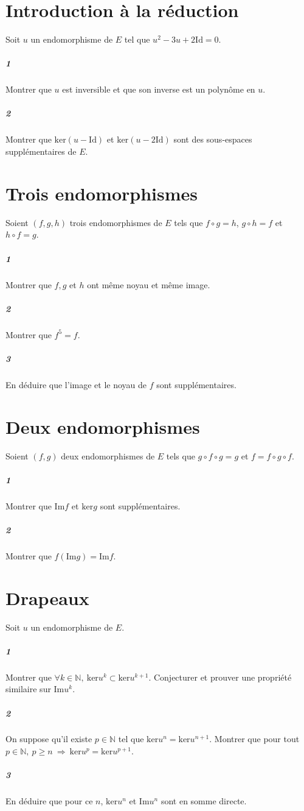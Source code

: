 \documentclass[10pt,a4paper]{article}
\begin{document}
\section{Introduction à la réduction}
Soit $u$ un endomorphisme de $E$ tel que $u^2-3u+2 \text{Id}=0$.
\subparagraph{1}Montrer que $u$ est inversible et que son inverse est un polynôme en $u$.
\subparagraph{2}Montrer que $\text{ker}(u-\text{Id})$ et $\text{ker}(u-2\text{Id})$ sont des sous-espaces supplémentaires de $E$.

\section{Trois endomorphismes}
Soient $(f,g,h)$ trois endomorphismes de $E$ tels que $f \circ g =h$, $g \circ h =f$ et $h \circ f =g$.
\subparagraph{1}Montrer que $f,g$ et $h$ ont même noyau et même image.
\subparagraph{2}Montrer que $f^5=f$.
\subparagraph{3}En déduire que l'image et le noyau de $f$ sont supplémentaires.

\section{Deux endomorphismes}
Soient $(f,g)$ deux endomorphismes de $E$ tels que $g \circ f \circ g =g$ et $f=f \circ g \circ f$.
\subparagraph{1}Montrer que $\text{Im}f$ et $\text{ker}g$ sont supplémentaires.
\subparagraph{2}Montrer que $f(\text{Im}g)=\text{Im}f$.

\section{Drapeaux}
Soit $u$ un endomorphisme de $E$. 
\subparagraph{1}Montrer que $\forall k \in  \mathbb{N}, \ \text{ker}u^k \subset \text{ker}u^{k+1}$. Conjecturer et prouver une propriété similaire sur $\text{Im}u^k$.
\subparagraph{2}On suppose qu'il existe $p \in \mathbb{N}$ tel que $\text{ker}u^n=\text{ker}u^{n+1}$. Montrer que pour tout $p \in \mathbb{N}, \ p \ge n \ \Rightarrow \ \text{ker}u^p=\text{ker}u^{p+1}$.
\subparagraph{3}En déduire que pour ce $n$, $\text{ker}u^n$ et $\text{Im}u^n$ sont en somme directe.
\end{document}
